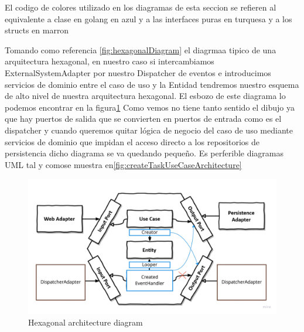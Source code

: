 
El codigo de colores utilizado en los diagramas de esta seccion se refieren al equivalente a clase en golang en azul y a las interfaces puras en turquesa  y a los structs en marron

%

Tomando como referencia \ref{fig:hexagonalDiagram} el diagrmaa tipico de una arquitectura hexagonal, en nuestro caso si intercambiamos ExternalSystemAdapter por nuestro Dispatcher de eventos e introducimos servicios de dominio entre el caso de uso y la Entidad tendremos nuestro esquema de alto nivel de nuestra arquitectura hexagonal. El esbozo de este diagrama lo podemos encontrar en la figura\ref{fig:CreateTaskHexagonalDiagram} Como vemos no tiene tanto sentido el dibujo ya que hay puertos de salida que se convierten en puertos de entrada como es el dispatcher y cuando queremos quitar lógica de negocio del caso de uso mediante servicios de dominio que impidan el acceso directo a los repositorios de persistencia dicho diagrama se va quedando pequeño. Es perferible diagramas UML tal y comose muestra en\ref{fig:createTaskUseCaseArchitecture}


\begin{figure}[H]
    \centering
    \includegraphics[height=0.3\textheight]{./part/Ejecucion/Seguimiento/CreateTaskUseCase/img/CreateTaskHexagonalDiagram}
    \caption{Hexagonal architecture diagram}\label{fig:CreateTaskHexagonalDiagram}
\end{figure}

